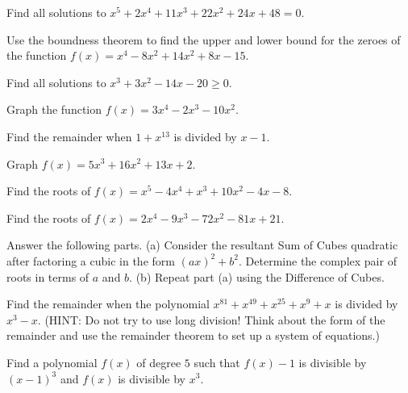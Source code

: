\documentclass[../book.tex]{subfiles}
\begin{document}
\begin{reviewset}
\item Find all solutions to $x^5+2x^4+11x^3+22x^2+24x+48=0$. \vspace{1mm}
\item Use the boundness theorem to find the upper and lower bound for the zeroes of the function $f(x)=x^4-8x^2+14x^2+8x-15$. \vspace{1mm}
\item Find all solutions to $x^3+3x^2-14x-20\geq 0$. \vspace{1mm}
\item Graph the function $f(x)=3x^4-2x^3-10x^2$. \vspace{1mm}
\item Find the remainder when $1+x^{13}$ is divided by $x-1$. \vspace{1mm}
\item Graph $f(x)=5x^3+16x^2+13x+2$. \vspace{1mm}
\end{reviewset}
\begin{challengeset}
\item Find the roots of $f(x)=x^5-4x^4+x^3+10x^2-4x-8$. \vspace{1mm}
\item Find the roots of $f(x)=2x^4-9x^3-72x^2-81x+21$. \vspace{1mm}
\item Answer the following parts. \newline
(a) Consider the resultant Sum of Cubes quadratic after factoring a cubic in the form $(ax)^2+b^2$. Determine the complex pair of roots in terms of $a$ and $b$. \newline 
(b) Repeat part (a) using the Difference of Cubes. \vspace{1mm}
\item Find the remainder when the polynomial $x^{81}+x^{49}+x^{25}+x^{9}+x$ is divided by $x^3-x$. (HINT: Do not try to use long division! Think about the form of the remainder and use the remainder theorem to set up a system of equations.) \vspace{1mm}
\item Find a polynomial $f(x)$ of degree $5$ such that $f(x)-1$ is divisible by $(x-1)^3$ and $f(x)$ is divisible by $x^3$. \vspace{1mm}
\end{challengeset}
\end{document}
